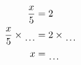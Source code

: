\documentclass[varwidth]{standalone}
\begin{document}
    \begin{varwidth}{0.25\paperwidth}
    \begin{align*}
    \frac{x}{5} &= 2\\
    \frac{x}{5} \times{\dotuline{\hspace{4mm}}} &= 2 \times{\dotuline{\hspace{4mm}}}\\
    x &= \dotuline{\hspace{4mm}}\\
\end{align*}
\end{varwidth}
\end{document}
